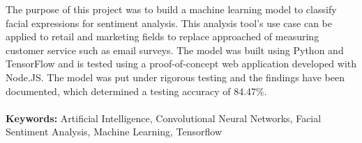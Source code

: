 

The purpose of this project was to build a machine learning model to classify facial expressions for sentiment analysis. This analysis tool's use case can be applied to retail and marketing fields to replace approached of measuring customer service such as email surveys. The model was built using Python and TensorFlow and is tested using a proof-of-concept web application developed with Node.JS. The model was put under rigorous testing and the findings have been documented, which determined a testing accuracy of 84.47\%. \\ \\
\textbf{Keywords:} Artificial Intelligence, Convolutional Neural Networks, Facial Sentiment Analysis, Machine Learning, Tensorflow
